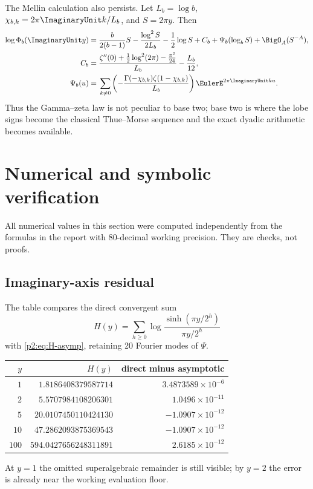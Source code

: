 \documentclass[11pt]{article}
\numberwithin{equation}{section}
\theoremstyle{definition}
\theoremstyle{remark}
\begin{document}
The Mellin calculation also persists.  Let $L_b=\log b$,
$\chi_{b,k}=2\pi\ImaginaryUnit k/L_b$, and $S=2\pi y$.  Then
\begin{align}
 \log\Phi_b(\ImaginaryUnit y)
 ={}&\frac{b}{2(b-1)}S-\frac{\log^2S}{2L_b}-\frac12\log S+C_b
 +\Psi_b(\log_bS)+\BigO_A(S^{-A}),                        \label{p2:eq:baseb-asymp}\\
 C_b={}&\frac{\zeta''(0)+\tfrac12\log^2(2\pi)-\tfrac{\pi^2}{24}}{L_b}
        -\frac{L_b}{12},                                  \label{p2:eq:Cb}\\
 \Psi_b(u)={}&\sum_{k\ne0}
 \left(-\frac{\Gamma(-\chi_{b,k})\zeta(1-\chi_{b,k})}{L_b}\right)
 \EulerE^{2\pi\ImaginaryUnit ku}.                                        \label{p2:eq:Psib}
\end{align}
Thus the Gamma--zeta law is not peculiar to base two; base two is where the lobe
signs become the classical Thue--Morse sequence and the exact dyadic arithmetic
becomes available.

\section{Numerical and symbolic verification}
\label{p2:sec:numerics}

All numerical values in this section were computed independently from the
formulas in the report with 80-decimal working precision.  They are checks, not
proofs.

\subsection{Imaginary-axis residual}

The table compares the direct convergent sum
\begin{equation}
 H(y)=\sum_{h\ge0}\log\frac{\sinh(\pi y/2^h)}{\pi y/2^h}                  \label{p2:eq:H-direct}
\end{equation}
with \eqref{p2:eq:H-asymp}, retaining 20 Fourier modes of $\Psi$.
\begin{center}
\begin{tabular}{@{}r r r@{}}
\toprule
$y$ & $H(y)$ & direct minus asymptotic \\
\midrule
$1$   & $1.8186408379587714$   & $ 3.4873589\times10^{-6}$ \\
$2$   & $5.5707984108206301$   & $ 1.0496\times10^{-11}$ \\
$5$   & $20.0107450110424130$  & $-1.0907\times10^{-12}$ \\
$10$  & $47.2862093875369543$  & $-1.0907\times10^{-12}$ \\
$100$ & $594.0427656248311891$ & $ 2.6185\times10^{-12}$ \\
\bottomrule
\end{tabular}
\end{center}
At $y=1$ the omitted superalgebraic remainder is still visible; by $y=2$ the
error is already near the working evaluation floor.
\end{document}
